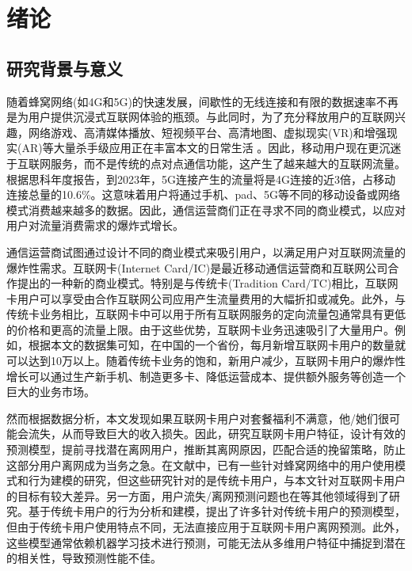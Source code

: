\section{绪论}
\subsection{研究背景与意义}
随着蜂窝网络(如4G和5G)的快速发展，间歇性的无线连接和有限的数据速率不再是为用户提供沉浸式互联网体验的瓶颈。与此同时，为了充分释放用户的互联网兴趣，网络游戏、高清媒体播放、短视频平台、高清地图、虚拟现实(VR)和增强现实(AR)等大量杀手级应用正在丰富本文的日常生活
。因此，移动用户现在更沉迷于互联网服务，而不是传统的点对点通信功能，这产生了越来越大的互联网流量。根据思科年度报告，到2023年，5G连接产生的流量将是4G连接的近3倍，占移动连接总量的10.6\%。这意味着用户将通过手机、pad、5G等不同的移动设备或网络模式消费越来越多的数据。因此，通信运营商们正在寻求不同的商业模式，以应对用户对流量消费需求的爆炸式增长。\par
通信运营商试图通过设计不同的商业模式来吸引用户，以满足用户对互联网流量的爆炸性需求。互联网卡(Internet Card/IC)是最近移动通信运营商和互联网公司合作提出的一种新的商业模式。特别是与传统卡(Tradition Card/TC)相比，互联网卡用户可以享受由合作互联网公司应用产生流量费用的大幅折扣或减免。此外，与传统卡业务相比，互联网卡中可以用于所有互联网服务的定向流量包通常具有更低的价格和更高的流量上限。由于这些优势，互联网卡业务迅速吸引了大量用户。例如，根据本文的数据集可知，在中国的一个省份，每月新增互联网卡用户的数量就可以达到10万以上。随着传统卡业务的饱和，新用户减少，互联网卡用户的爆炸性增长可以通过生产新手机、制造更多卡、降低运营成本、提供额外服务等创造一个巨大的业务市场。\par
然而根据数据分析，本文发现如果互联网卡用户对套餐福利不满意，他/她们很可能会流失，从而导致巨大的收入损失。因此，研究互联网卡用户特征，设计有效的预测模型，提前寻找潜在离网用户，推断其离网原因，匹配合适的挽留策略，防止这部分用户离网成为当务之急。在文献中，已有一些针对蜂窝网络中的用户使用模式和行为建模的研究，但这些研究针对的是传统卡用户，与本文针对互联网卡用户的目标有较大差异。另一方面，用户流失/离网预测问题也在等其他领域得到了研究。基于传统卡用户的行为分析和建模，提出了许多针对传统卡用户的预测模型，但由于传统卡用户使用特点不同，无法直接应用于互联网卡用户离网预测。此外，这些模型通常依赖机器学习技术进行预测，可能无法从多维用户特征中捕捉到潜在的相关性，导致预测性能不佳。\par
